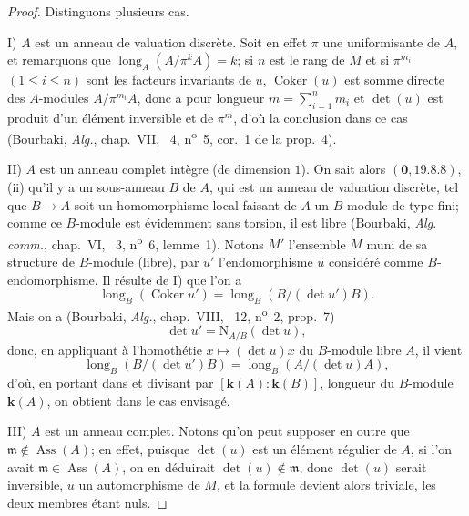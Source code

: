 \begin{proof}
Distinguons plusieurs cas.

I) $A$ est un anneau de valuation discrète.
Soit en effet $\pi$ une uniformisante de $A$, et remarquons que $\operatorname{long}_A(A/\pi^kA)=k$;
si $n$ est le rang de $M$ et si $\pi^{m_i}$ $(1\leq i\leq n)$ sont les facteurs invariants de $u$, $\operatorname{Coker}(u)$ est somme directe des $A$-modules $A/\pi^{m_i}A$, donc a pour longueur $m=\sum_{i=1}^nm_i$ et $\det(u)$ est produit d'un élément inversible et de $\pi^m$, d'où la conclusion dans ce cas (Bourbaki, \emph{Alg.}, chap.~VII, \textsection~4, n\textsuperscript{o}~5, cor.~1 de la prop.~4).

II) $A$ est un anneau complet intègre (de dimension $1$).
On sait alors $(\mathbf{0},19.8.8)$, (ii) qu'il y a un sous-anneau $B$ de $A$, qui est un anneau de valuation discrète, tel que $B\to A$ soit un homomorphisme local faisant de $A$ un $B$-module de type fini;
comme ce $B$-module est évidemment sans torsion, il est libre (Bourbaki, \emph{Alg. comm.}, chap.~VI, \textsection~3, n\textsuperscript{o}~6, lemme~1).
Notons $M'$ l'ensemble $M$ muni de sa structure de $B$-module (libre), par $u'$ l'endomorphisme $u$ considéré comme $B$-endomorphisme.
Il résulte de I) que l'on a
\[
\label{IV.21.10.17.5}
  \operatorname{long}_B(\operatorname{Coker}u')=\operatorname{long}_B(B/(\det u')B).
  \tag{21.10.17.5}
\]
Mais on a (Bourbaki, \emph{Alg.}, chap.~VIII, \textsection~12, n\textsuperscript{o}~2, prop.~7)
\[
  \det u'=\mathrm{N}_{A/B}(\det u),
\]
donc, en appliquant  à l'homothétie $x\mapsto(\det u)x$ du $B$-module libre $A$, il vient
\[
  \operatorname{long}_B(B/(\det u')B)=\operatorname{long}_B(A/(\det u)A),
\]
d'où, en portant dans  et divisant par $[\boldsymbol{k}(A):\boldsymbol{k}(B)]$, longueur du $B$-module $\boldsymbol{k}(A)$, on obtient  dans le cas envisagé.

III) $A$ est un anneau complet.
Notons qu'on peut supposer en outre que $\mathfrak{m}\notin\operatorname{Ass}(A)$;
en effet, puisque $\det(u)$ est un élément régulier de $A$, si l'on avait $\mathfrak{m}\in\operatorname{Ass}(A)$, on en déduirait $\det(u)\notin\mathfrak{m}$, donc $\det(u)$ serait inversible, $u$ un automorphisme de $M$, et la formule  devient alors triviale, les deux membres étant nuls.


\end{proof}
